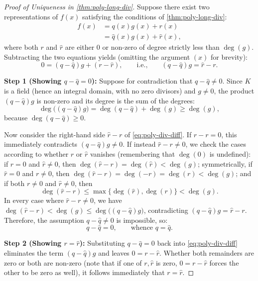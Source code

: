 \begin{proofWrapper}
\begin{content}
\begin{proof}[Proof of Uniqueness in \cref{thm:poly-long-div}]
Suppose there exist two representations of $f(x)$ satisfying the conditions of \cref{thm:poly-long-div}:
\begin{align*}
f(x) &= q(x) g(x) + r(x) \\
     &= \hat{q}(x) g(x) + \hat{r}(x),
\end{align*}
where both $r$ and $\hat{r}$ are either $0$ or non-zero of degree strictly less than $\deg(g)$. Subtracting the two equations yields (omitting the argument $(x)$ for brevity):
\begin{equation}\label{eq:poly-div-diff}
0 = (q - \hat{q}) g + (r - \hat{r}), \qquad \text{i.e.,} \qquad (q - \hat{q}) g = \hat{r} - r.
\end{equation}

\textbf{Step 1 (Showing $q - \hat{q} = 0$):} Suppose for contradiction that $q - \hat{q} \neq 0$. Since $K$ is a field (hence an integral domain, with no zero divisors) and $g \neq 0$, the product $(q - \hat{q}) g$ is non-zero and its degree is the sum of the degrees:
\[
\deg\bigl((q - \hat{q}) g\bigr) = \deg(q - \hat{q}) + \deg(g) \ge \deg(g),
\]
because $\deg(q - \hat{q}) \ge 0$.

Now consider the right-hand side $\hat{r} - r$ of \eqref{eq:poly-div-diff}. If $\hat{r} - r = 0$, this immediately contradicts $(q - \hat{q}) g \neq 0$. If instead $\hat{r} - r \neq 0$, we check the cases according to whether $r$ or $\hat{r}$ vanishes (remembering that $\deg(0)$ is undefined):
if $r = 0$ and $\hat{r} \neq 0$, then $\deg(\hat{r} - r) = \deg(\hat{r}) < \deg(g)$; symmetrically, if $\hat{r} = 0$ and $r \neq 0$, then $\deg(\hat{r} - r) = \deg(-r) = \deg(r) < \deg(g)$; and if both $r \neq 0$ and $\hat{r} \neq 0$, then
\[
\deg(\hat{r} - r) \le \max\{\deg(\hat{r}), \deg(r)\} < \deg(g).
\]
In every case where $\hat{r} - r \neq 0$, we have $\deg(\hat{r} - r) < \deg(g) \le \deg\bigl((q - \hat{q}) g\bigr)$, contradicting $(q - \hat{q}) g = \hat{r} - r$. Therefore, the assumption $q - \hat{q} \neq 0$ is impossible, so:
\[
q - \hat{q} = 0, \qquad \text{whence } q = \hat{q}.
\]

\textbf{Step 2 (Showing $r = \hat{r}$):} Substituting $q - \hat{q} = 0$ back into \eqref{eq:poly-div-diff} eliminates the term $(q - \hat{q}) g$ and leaves $0 = r - \hat{r}$. Whether both remainders are zero or both are non-zero (note that if one of $r, \hat{r}$ is zero, $0 = r - \hat{r}$ forces the other to be zero as well), it follows immediately that $r = \hat{r}$.
\end{proof}
\end{content}

\end{proofWrapper}

